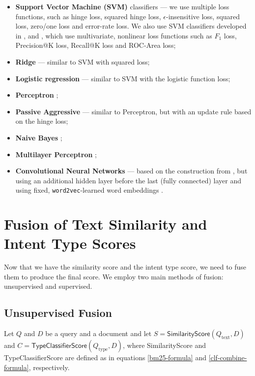 \begin{itemize}
 \item \textbf{Support Vector Machine (SVM)} classifiers ---
we use multiple loss functions, such as hinge loss,
squared hinge loss, $\epsilon$-insensitive loss, squared loss, zero/one loss and error-rate loss. 
We also use SVM classifiers developed in \cite{svmperf3}, \cite{svmperf1} and
\cite{svmperf2}, which use multivariate,
nonlinear loss functions such as $F_1$ loss, Precision@K loss, Recall@K loss and ROC-Area loss;
\item \textbf{Ridge} \cite{scikit} --- similar to SVM with squared loss;
\item \textbf{Logistic regression} \cite{scikit} --- similar to SVM with the logistic function loss;
\item \textbf{Perceptron} \cite{scikit};
\item \textbf{Passive Aggressive} \cite{passiveAggr} --- similar to Perceptron, but with an update rule
  based on the hinge loss;
\item \textbf{Naive Bayes} \cite{ir-intro};
\item \textbf{Multilayer Perceptron} \cite{scikit};
\item \textbf{Convolutional Neural Networks} --- based on the construction from \cite{cnn}, but using an additional
hidden layer before the last (fully connected) layer and using fixed, \texttt{word2vec}-learned word embeddings \cite{w2v}.
\end{itemize}

\section{Fusion of Text Similarity and Intent Type Scores}
Now that we have the similarity score and the intent type score, we need to fuse them to produce the final score.
We employ two main methods of fusion: unsupervised and supervised.

\subsection{Unsupervised Fusion}
Let $Q$ and $D$ be a query and a document and let $S=\textsf{SimilarityScore}(Q_{\text{text}}, D)$
and $C=\textsf{TypeClassifierScore}(Q_{\text{type}}, D)$, where \textsf{SimilarityScore} and \textsf{TypeClassifierScore}
are defined as in equations \ref{bm25-formula} and \ref{clf-combine-formula}, respectively.

